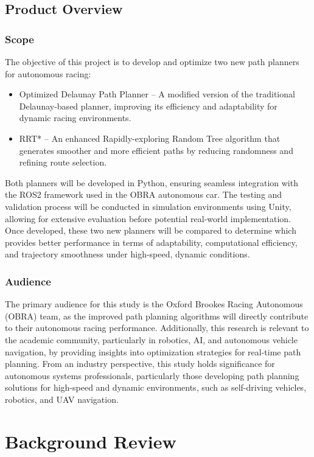 \documentclass[a4paper,12pt]{report}
\begin{document}
\section{Product Overview}
\subsection{Scope}
The objective of this project is to develop and optimize two new path planners for autonomous racing:
\begin{itemize}
    \item Optimized Delaunay Path Planner – A modified version of the traditional Delaunay-based planner, improving its efficiency and adaptability for dynamic racing environments.
    \item RRT* – An enhanced Rapidly-exploring Random Tree algorithm that generates smoother and more efficient paths by reducing randomness and refining route selection.
\end{itemize}
Both planners will be developed in Python, ensuring seamless integration with the ROS2 framework used in the OBRA autonomous car. The testing and validation process will be conducted in simulation environments using Unity, allowing for extensive evaluation before potential real-world implementation.
Once developed, these two new planners will be compared to determine which provides better performance in terms of adaptability, computational efficiency, and trajectory smoothness under high-speed, dynamic conditions.

\subsection{Audience}
The primary audience for this study is the Oxford Brookes Racing Autonomous (OBRA) team, as the improved path planning algorithms will directly contribute to their autonomous racing performance.
Additionally, this research is relevant to the academic community, particularly in robotics, AI, and autonomous vehicle navigation, by providing insights into optimization strategies for real-time path planning.
From an industry perspective, this study holds significance for autonomous systems professionals, particularly those developing path planning solutions for high-speed and dynamic environments, such as self-driving vehicles, robotics, and UAV navigation.


\newpage

\chapter{Background Review}
\end{document}

